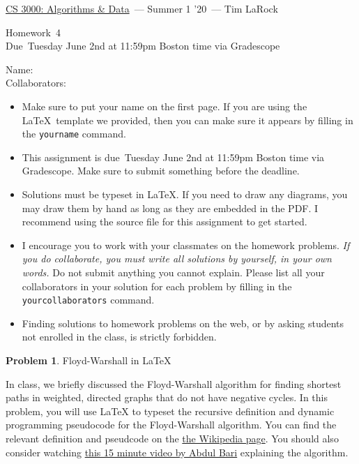\documentclass[11pt]{article}
\newcommand{\yourname}{}
\newcommand{\yourcollaborators}{}
\newcommand{\course}{\href{tlarock.github.io/teaching/cs3000/syllabus.html}{CS 3000: Algorithms \& Data}}
\newcommand{\instructor}{Tim LaRock}
\newcommand{\semester}{Summer 1 '20}
\newcommand{\hwnum}{4}
\newcommand{\hwdue}{Tuesday June 2nd at 11:59pm Boston time via Gradescope}
\theoremstyle{definition}
\theoremstyle{theorem}
\newtheorem{prob}{Problem}
\begin{document}
{\Large 
\begin{center} \course\ --- \semester\ --- \instructor \end{center}}
{\large
\vspace{10pt}
\noindent Homework~\hwnum \vspace{2pt}\\
Due~\hwdue}

\bigskip
{\large
\noindent Name: \yourname \vspace{2pt}\\ Collaborators: \yourcollaborators}

\vspace{15pt}
\begin{itemize}
	
	\item Make sure to put your name on the first page.  If you are using the \LaTeX~template we provided, then you can make sure it appears by filling in the \texttt{yourname} command.
	
	\item This assignment is due~\hwdue.  Make sure to submit something before the deadline.
	
	\item Solutions must be typeset in \LaTeX.  If you need to draw any diagrams, you may draw them by hand as long as they are embedded in the PDF.  I recommend using the source file for this assignment to get started.
	
	\item I encourage you to work with your classmates on the homework problems. \emph{If you do collaborate, you must write all solutions by yourself, in your own words.}  Do not submit anything you cannot explain.  Please list all your collaborators in your solution for each problem by filling in the \texttt{yourcollaborators} command.
	
	\item Finding solutions to homework problems on the web, or by asking students not enrolled in the class, is strictly forbidden.
	
\end{itemize}

\newpage
\begin{prob}Floyd-Warshall in \LaTeX \end{prob}

In class, we briefly discussed the Floyd-Warshall algorithm for finding shortest paths in weighted, directed graphs that do not have negative cycles. In this problem, you will use LaTeX to typeset the recursive definition and dynamic programming pseudocode for the Floyd-Warshall algorithm. You can find the relevant definition and pseudcode on the \href{https://en.wikipedia.org/wiki/Floyd\%E2\%80\%93Warshall\_algorithm}{the Wikipedia page}. You should also consider watching \href{https://www.youtube.com/watch?v=oNI0rf2P9gE}{this 15 minute video by Abdul Bari} explaining the algorithm.
\end{document}
